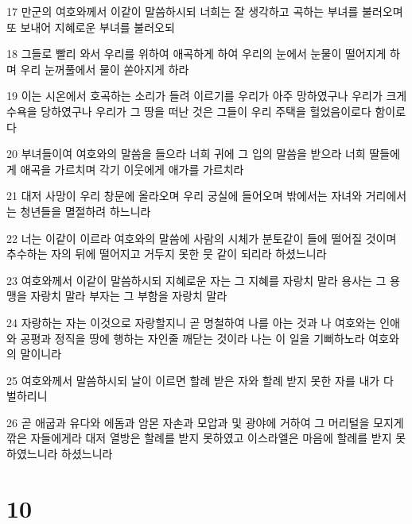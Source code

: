 \par 17 만군의 여호와께서 이같이 말씀하시되 너희는 잘 생각하고 곡하는 부녀를 불러오며 또 보내어 지혜로운 부녀를 불러오되
\par 18 그들로 빨리 와서 우리를 위하여 애곡하게 하여 우리의 눈에서 눈물이 떨어지게 하며 우리 눈꺼풀에서 물이 쏟아지게 하라
\par 19 이는 시온에서 호곡하는 소리가 들려 이르기를 우리가 아주 망하였구나 우리가 크게 수욕을 당하였구나 우리가 그 땅을 떠난 것은 그들이 우리 주택을 헐었음이로다 함이로다
\par 20 부녀들이여 여호와의 말씀을 들으라 너희 귀에 그 입의 말씀을 받으라 너희 딸들에게 애곡을 가르치며 각기 이웃에게 애가를 가르치라
\par 21 대저 사망이 우리 창문에 올라오며 우리 궁실에 들어오며 밖에서는 자녀와 거리에서는 청년들을 멸절하려 하느니라
\par 22 너는 이같이 이르라 여호와의 말씀에 사람의 시체가 분토같이 들에 떨어질 것이며 추수하는 자의 뒤에 떨어지고 거두지 못한 뭇 같이 되리라 하셨느니라
\par 23 여호와께서 이같이 말씀하시되 지혜로운 자는 그 지혜를 자랑치 말라 용사는 그 용맹을 자랑치 말라 부자는 그 부함을 자랑치 말라
\par 24 자랑하는 자는 이것으로 자랑할지니 곧 명철하여 나를 아는 것과 나 여호와는 인애와 공평과 정직을 땅에 행하는 자인줄 깨닫는 것이라 나는 이 일을 기뻐하노라 여호와의 말이니라
\par 25 여호와께서 말씀하시되 날이 이르면 할례 받은 자와 할례 받지 못한 자를 내가 다 벌하리니
\par 26 곧 애굽과 유다와 에돔과 암몬 자손과 모압과 및 광야에 거하여 그 머리털을 모지게 깎은 자들에게라 대저 열방은 할례를 받지 못하였고 이스라엘은 마음에 할례를 받지 못하였느니라 하셨느니라

\chapter{10}

